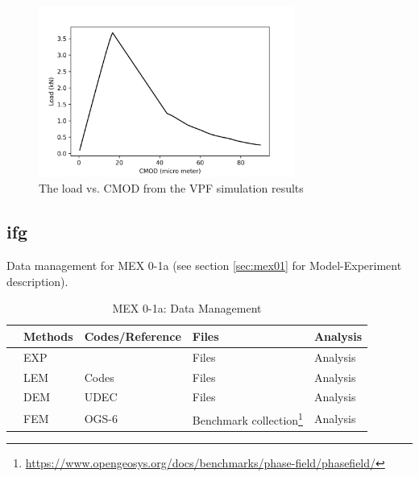 \begin{figure}[!ht]
\centering
\includegraphics[width=0.75\textwidth]{figures/VPF_ME1_NF_CMOD.png}
\caption{The load vs. CMOD from the VPF simulation results}
\label{fig:Keita_ME1_VPF_Rockville}
\end{figure}

\subsection*{ifg}

Data management for MEX 0-1a (see section \ref{sec:mex01} for Model-Experiment description).


\begin{table}[!ht]
\footnotesize
\centering
\caption{MEX 0-1a: Data Management}
\label{tab:dms-mex0-1}
\begin{tabular}{|L{0.5cm}|L{1cm}|L{2cm}|L{3cm}|L{1cm}|} 
\hline
 & Methods & Codes/Reference & Files & Analysis \\ \hline
 & EXP & \cite{} & Files & Analysis \\ \hline
 & LEM & Codes & Files & Analysis \\ \hline
 & DEM & UDEC & Files & Analysis \\ \hline
 & FEM & OGS-6 & Benchmark collection\footnote{\url{https://www.opengeosys.org/docs/benchmarks/phase-field/phasefield/}} & Analysis \\ \hline
\end{tabular}
\end{table}
\normalsize

